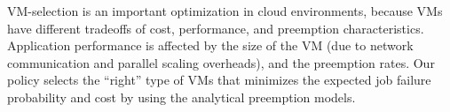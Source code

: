 VM-selection is an important optimization in cloud environments, because VMs have different tradeoffs of cost, performance, and preemption characteristics. 
Application performance is affected by the size of the VM (due to network communication and parallel scaling overheads), and the preemption rates. 
Our policy selects the ``right'' type of  VMs that minimizes the expected job failure probability and cost by using the analytical preemption models. 





%

